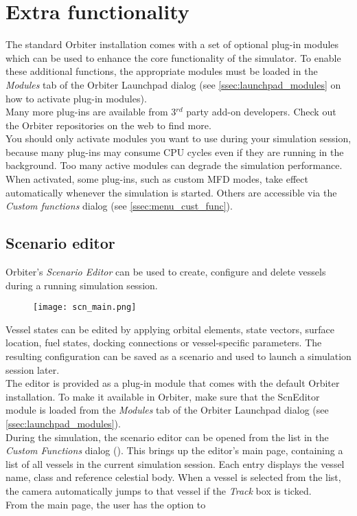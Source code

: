 \documentclass[Orbiter User Manual.tex]{subfiles}
\begin{document}
\section{Extra functionality}
\label{sec:extra}
The standard Orbiter installation comes with a set of optional plug-in modules which can be used to enhance the core functionality of the simulator. To enable these additional functions, the appropriate modules must be loaded in the \textit{Modules} tab of the Orbiter Launchpad dialog (see \ref{ssec:launchpad_modules} on how to activate plug-in modules).\\
Many more plug-ins are available from 3$^{rd}$ party add-on developers. Check out the Orbiter repositories on the web to find more.\\
You should only activate modules you want to use during your simulation session, because many plug-ins may consume CPU cycles even if they are running in the background. Too many active modules can degrade the simulation performance.\\
When activated, some plug-ins, such as custom MFD modes, take effect automatically whenever the simulation is started. Others are accessible via the \textit{Custom functions} dialog (see \ref{ssec:menu_cust_func}).


\subsection{Scenario editor}
\label{ssec:scn_editor}
Orbiter's \textit{Scenario Editor} can be used to create, configure and delete vessels during a running simulation session.

\begin{figure}[H]
	\centering
	\texttt{[image: scn\_main.png]}
\end{figure}

\noindent
Vessel states can be edited by applying orbital elements, state vectors, surface location, fuel states, docking connections or vessel-specific parameters. The resulting configuration can be saved as a scenario and used to launch a simulation session later.\\
The editor is provided as a plug-in module that comes with the default Orbiter installation. To make it available in Orbiter, make sure that the ScnEditor module is loaded from the \textit{Modules} tab of the Orbiter Launchpad dialog (see \ref{ssec:launchpad_modules}).\\
During the simulation, the scenario editor can be opened from the list in the \textit{Custom Functions} dialog (\Ctrl{}). This brings up the editor's main page, containing a list of all vessels in the current simulation session. Each entry displays the vessel name, class and reference celestial body. When a vessel is selected from the list, the camera automatically jumps to that vessel if the \textit{Track} box is ticked.\\
From the main page, the user has the option to
\end{document}
